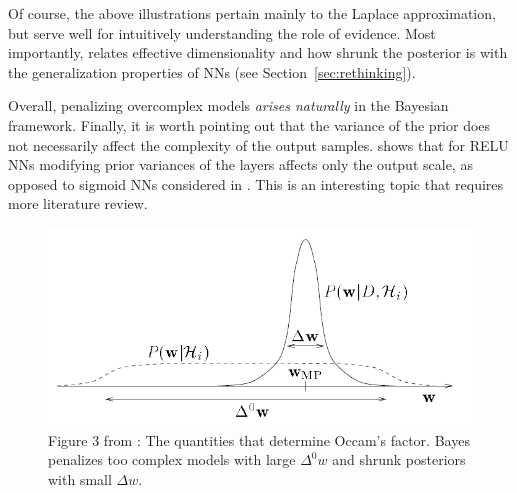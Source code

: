 Of course, the above illustrations pertain mainly to the Laplace approximation, but serve well for intuitively understanding the role of evidence. 
Most importantly, \textcite{maddox2020rethinking} relates effective dimensionality and how shrunk the posterior is with the generalization properties of NNs (see Section~\ref{sec:rethinking}).

Overall, penalizing overcomplex models \textit{arises naturally} in the Bayesian framework. 
Finally, it is worth pointing out that the variance of the prior does not necessarily affect the complexity of the output samples. 
\textcite{wilson2020bayesian} shows that for RELU NNs modifying prior variances of the layers affects only the output scale, as opposed to sigmoid NNs considered in \textcite{mackay1995probable}. 
This is an interesting topic that requires more literature review.

\begin{figure}
	\centering
	\includegraphics[width=0.7\linewidth]{./Figures/occam_2.png}
	\caption{Figure 3 from \textcite{mackay1992bayesian}: The quantities that determine Occam's factor. 
	Bayes penalizes too complex models with large $\Delta^0 w$ and shrunk posteriors with small $\Delta w$.}
	\label{fig:occam_2}
\end{figure} 

